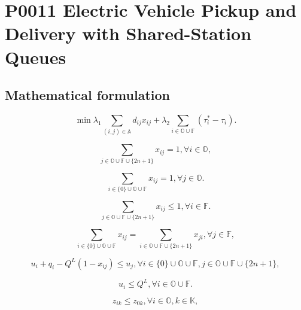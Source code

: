\documentclass[10pt]{article}
\begin{document}
\section*{P0011 Electric Vehicle Pickup and Delivery with Shared-Station Queues}
\subsection*{Mathematical formulation}
\begin{equation}
    \label{eq:1}
    \min \lambda_1 \sum_{(i,j) \in \mathbb{A}} d_{ij}x_{ij} + \lambda_2 \sum_{i \in \mathbb{O} \cup \mathbb{F}} (\tau_i^* - \tau_i). \tag{1}
\end{equation}

\begin{equation}
    \label{eq:2}
    \sum_{j \in \mathbb{O} \cup \mathbb{F} \cup \{2n+1\}} x_{ij} = 1, \forall i \in \mathbb{O}, \tag{2}
\end{equation}

\begin{equation}
    \label{eq:3}
    \sum_{i \in \{0\} \cup \mathbb{O} \cup \mathbb{F}} x_{ij} = 1, \forall j \in \mathbb{O}. \tag{3}
\end{equation}

\begin{equation}
    \label{eq:4}
    \sum_{j \in \mathbb{O} \cup \mathbb{F} \cup \{2n+1\}} x_{ij} \le 1, \forall i \in \mathbb{F}. \tag{4}
\end{equation}

\begin{equation}
    \label{eq:5}
    \sum_{i \in \{0\} \cup \mathbb{O} \cup \mathbb{F}} x_{ij} = \sum_{i \in \mathbb{O} \cup \mathbb{F} \cup \{2n+1\}} x_{ji}, \forall j \in \mathbb{F}, \tag{5}
\end{equation}

\begin{equation}
    \label{eq:6}
    u_i + q_i - Q^L(1 - x_{ij}) \le u_j, \forall i \in \{0\} \cup \mathbb{O} \cup \mathbb{F}, j \in \mathbb{O} \cup \mathbb{F} \cup \{2n+1\}, \tag{6}
\end{equation}

\begin{equation}
    \label{eq:7}
    u_i \le Q^L, \forall i \in \mathbb{O} \cup \mathbb{F}. \tag{7}
\end{equation}

\begin{equation}
    \label{eq:8}
    z_{ik} \le z_{0k}, \forall i \in \mathbb{O}, k \in \mathbb{K}, \tag{8}
\end{equation}
\end{document}
